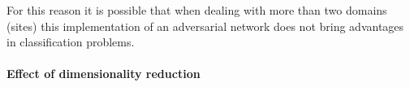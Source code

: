 \documentclass[11pt]{report}
\begin{document}
For this reason it is possible that when dealing with more than two domains (sites) this implementation of an adversarial network does not bring advantages in classification problems.








\paragraph{Effect of dimensionality reduction}
\end{document}
